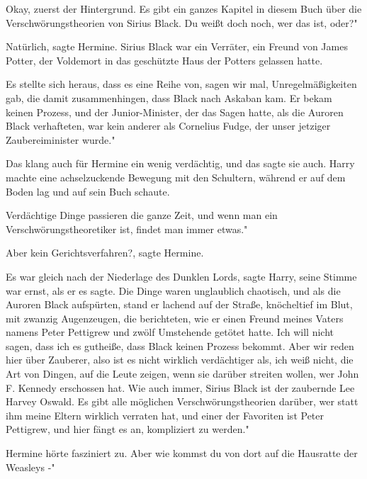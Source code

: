 \glqq Okay, zuerst der Hintergrund. Es gibt ein ganzes Kapitel in diesem Buch
über die Verschwörungstheorien von Sirius Black. Du weißt doch noch, wer das
ist, oder?"

\glqq Natürlich\grqq{}, sagte Hermine. Sirius Black war ein Verräter, ein Freund
von James Potter, der Voldemort in das geschützte Haus der Potters gelassen
hatte.

\glqq Es stellte sich heraus, dass es eine Reihe von, sagen wir mal,
Unregelmäßigkeiten gab, die damit zusammenhingen, dass Black nach Askaban kam.
Er bekam keinen Prozess, und der Junior-Minister, der das Sagen hatte, als die
Auroren Black verhafteten, war kein anderer als Cornelius Fudge, der unser
jetziger Zaubereiminister wurde."

Das klang auch für Hermine ein wenig verdächtig, und das sagte sie auch. Harry
machte eine achselzuckende Bewegung mit den Schultern, während er auf dem Boden
lag und auf sein Buch schaute.

\glqq Verdächtige Dinge passieren die ganze Zeit, und wenn man ein
Verschwörungstheoretiker ist, findet man immer etwas."

\glqq Aber kein Gerichtsverfahren?\grqq{}, sagte Hermine.

\glqq Es war gleich nach der Niederlage des Dunklen Lords\grqq{}, sagte Harry,
seine Stimme war ernst, als er es sagte. \glqq Die Dinge waren unglaublich
chaotisch, und als die Auroren Black aufspürten, stand er lachend auf der
Straße, knöcheltief im Blut, mit zwanzig Augenzeugen, die berichteten, wie er
einen Freund meines Vaters namens Peter Pettigrew und zwölf Umstehende getötet
hatte. Ich will nicht sagen, dass ich es gutheiße, dass Black keinen Prozess
bekommt. Aber wir reden hier über Zauberer, also ist es nicht wirklich
verdächtiger als, ich weiß nicht, die Art von Dingen, auf die Leute zeigen, wenn
sie darüber streiten wollen, wer John F. Kennedy erschossen hat. Wie auch immer,
Sirius Black ist der zaubernde Lee Harvey Oswald. Es gibt alle möglichen
Verschwörungstheorien darüber, wer statt ihm meine Eltern wirklich verraten hat,
und einer der Favoriten ist Peter Pettigrew, und hier fängt es an, kompliziert
zu werden."

Hermine hörte fasziniert zu. \glqq Aber wie kommst du von dort auf die Hausratte
der Weasleys -"

